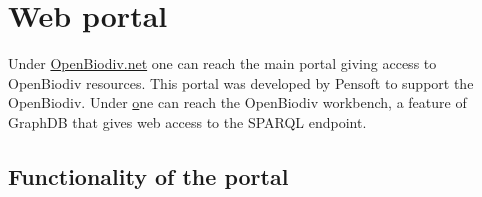 
\chapter{Web portal} %
\label{chapter-webportal}


Under \href{http://openbiodiv.net}{OpenBiodiv.net} one can reach the main portal giving access to OpenBiodiv resources. This portal was developed by Pensoft to support the OpenBiodiv. Under \href{http://graph.openbiodiv.net} one can reach the OpenBiodiv workbench, a feature of GraphDB that gives web access to the SPARQL endpoint.

\section{Functionality of the portal}


